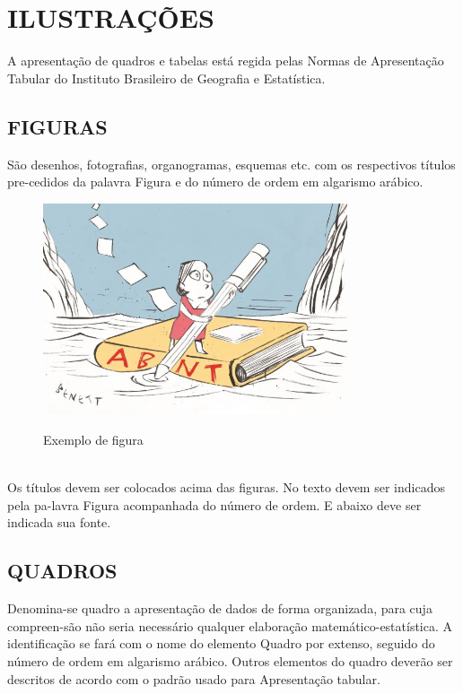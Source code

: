 %
%

\chapter{ILUSTRAÇÕES}

A apresentação de quadros e tabelas está regida pelas Normas de Apresentação Tabular do Instituto Brasileiro de Geografia e Estatística.

\section{FIGURAS}

São desenhos, fotografias, organogramas, esquemas etc. com os respectivos títulos pre-cedidos da palavra Figura e do número de ordem em algarismo arábico.

\begin{figure}[!htb]
    \centering
    \caption{Exemplo de figura}
	\vspace*{0,2cm}
    \includegraphics[width=0.8\textwidth]{./04-figuras/navegar_abnt}
    \label{fig:ilustfig}
\end{figure}
\vspace*{-0,9cm}
{\raggedright {}}\\

Os títulos devem ser colocados acima das figuras. No texto devem
ser indicados pela pa-lavra Figura acompanhada do número de ordem. E abaixo deve ser indicada sua fonte.

\section{QUADROS}

Denomina-se quadro a apresentação de dados de forma organizada, para cuja compreen-são não seria necessário qualquer elaboração matemático-estatística. A identificação se fará com o nome do elemento Quadro por extenso, seguido do número de ordem em algarismo arábico. Outros elementos do quadro deverão ser descritos de acordo com o padrão usado para
Apresentação tabular.

